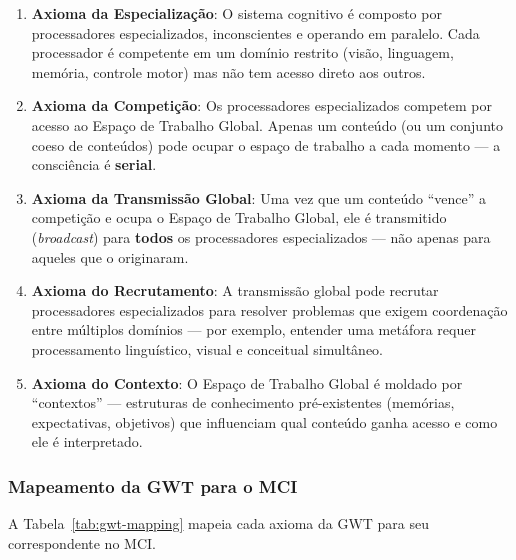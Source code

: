 \begin{enumerate}
    \item \textbf{Axioma da Especialização}: O sistema cognitivo é composto por processadores especializados, inconscientes e operando em paralelo. Cada processador é competente em um domínio restrito (visão, linguagem, memória, controle motor) mas não tem acesso direto aos outros.
    
    \item \textbf{Axioma da Competição}: Os processadores especializados competem por acesso ao Espaço de Trabalho Global. Apenas um conteúdo (ou um conjunto coeso de conteúdos) pode ocupar o espaço de trabalho a cada momento — a consciência é \textbf{serial}.
    
    \item \textbf{Axioma da Transmissão Global}: Uma vez que um conteúdo ``vence'' a competição e ocupa o Espaço de Trabalho Global, ele é transmitido (\textit{broadcast}) para \textbf{todos} os processadores especializados — não apenas para aqueles que o originaram.
    
    \item \textbf{Axioma do Recrutamento}: A transmissão global pode recrutar processadores especializados para resolver problemas que exigem coordenação entre múltiplos domínios — por exemplo, entender uma metáfora requer processamento linguístico, visual e conceitual simultâneo.
    
    \item \textbf{Axioma do Contexto}: O Espaço de Trabalho Global é moldado por ``contextos'' — estruturas de conhecimento pré-existentes (memórias, expectativas, objetivos) que influenciam qual conteúdo ganha acesso e como ele é interpretado.
\end{enumerate}

\subsubsection{Mapeamento da GWT para o MCI}

A Tabela~\ref{tab:gwt-mapping} mapeia cada axioma da GWT para seu correspondente no MCI.


